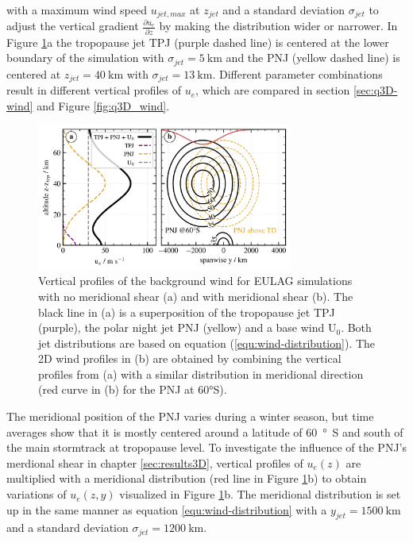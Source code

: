 with a maximum wind speed $u_{jet,max}$ at $z_{jet}$ and a standard deviation $\sigma_{jet}$ to adjust the vertical gradient $\frac{\partial u_e}{\partial z}$ by making the distribution wider or narrower. In Figure \ref{fig:wind_profs}a the tropopause jet TPJ (purple dashed line) is centered at the lower boundary of the simulation with $\sigma_{jet}=\SI{5}{\kilo\meter}$ and the PNJ (yellow dashed line) is centered at $z_{jet}=\SI{40}{\kilo\meter}$ with $\sigma_{jet}=\SI{13}{\kilo\meter}$. Different parameter combinations result in different vertical profiles of $u_e$, which are compared in section \ref{sec:q3D-wind} and Figure \ref{fig:q3D_wind}.

\begin{figure}[tbp]
    \centering
    \includegraphics[width=0.75\textwidth]{figures_model/eulag-wind-profiles.png}
    \caption{Vertical profiles of the background wind for EULAG simulations with no meridional shear (a) and with meridional shear (b). The black line in (a) is a superposition of the tropopause jet TPJ (purple), the polar night jet PNJ (yellow) and a base wind U$_0$. Both jet distributions are based on equation (\ref{equ:wind-distribution}). The 2D wind profiles in (b) are obtained by combining the vertical profiles from (a) with a similar distribution in meridional direction (red curve in (b) for the PNJ at 60°S).}
    \label{fig:wind_profs}
\end{figure} 
%
The meridional position of the PNJ varies during a winter season, but time averages show that it is mostly centered around a latitude of \SI{60}{\degree S} and south of the main stormtrack at tropopause level. To investigate the influence of the PNJ's merdional shear in chapter \ref{sec:results3D}, vertical profiles of $u_e(z)$ are multiplied with a meridional distribution (red line in Figure \ref{fig:wind_profs}b) to obtain variations of $u_e(z,y)$ visualized in Figure \ref{fig:wind_profs}b. The meridional distribution is set up in the same manner as equation \ref{equ:wind-distribution} with a $y_{jet}=\SI{1500}{\kilo\meter}$ and a standard deviation $\sigma_{jet}=\SI{1200}{\kilo\meter}$.

